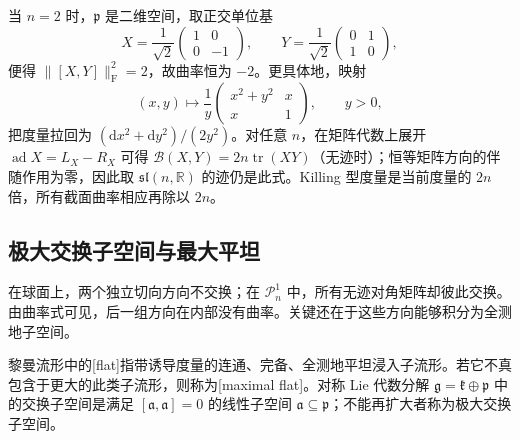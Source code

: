 \begin{example}
	当 \(n=2\) 时，\(\mathfrak p\) 是二维空间，取正交单位基
	\[
		X=\frac1{\sqrt2}\begin{pmatrix}1&0\\0&-1\end{pmatrix},\qquad
		Y=\frac1{\sqrt2}\begin{pmatrix}0&1\\1&0\end{pmatrix},
	\]
	便得 \(\lVert[X,Y]\rVert_{\mathrm F}^2=2\)，故曲率恒为 \(-2\)。更具体地，映射
	\[
		(x,y)\longmapsto\frac1y\begin{pmatrix}x^2+y^2&x\\x&1\end{pmatrix},\qquad y>0,
	\]
	把度量拉回为 \((\mathrm dx^2+\mathrm dy^2)/(2y^2)\)。对任意 \(n\)，在矩阵代数上展开 \(\operatorname{ad}X=L_X-R_X\) 可得
	\(\mathcal B(X,Y)=2n\operatorname{tr}(XY)\)（无迹时）；恒等矩阵方向的伴随作用为零，因此取 \(\mathfrak{sl}(n,\mathbb R)\) 的迹仍是此式。Killing 型度量是当前度量的 \(2n\) 倍，所有截面曲率相应再除以 \(2n\)。
\end{example}

\subsection{极大交换子空间与最大平坦}
\label{g3:subsec:0504:05}

在球面上，两个独立切向方向不交换；在 \(\mathcal P_n^1\) 中，所有无迹对角矩阵却彼此交换。由曲率式可见，后一组方向在内部没有曲率。关键还在于这些方向能够积分为全测地子空间。

\begin{definition}\label{g3:def:flat-and-maximal-abelian}
	黎曼流形中的[flat]指带诱导度量的连通、完备、全测地平坦浸入子流形。若它不真包含于更大的此类子流形，则称为[maximal flat]。对称 Lie 代数分解 \(\mathfrak g=\mathfrak k\oplus\mathfrak p\) 中的交换子空间是满足 \([\mathfrak a,\mathfrak a]=0\) 的线性子空间 \(\mathfrak a\subseteq\mathfrak p\)；不能再扩大者称为极大交换子空间。
\end{definition}

